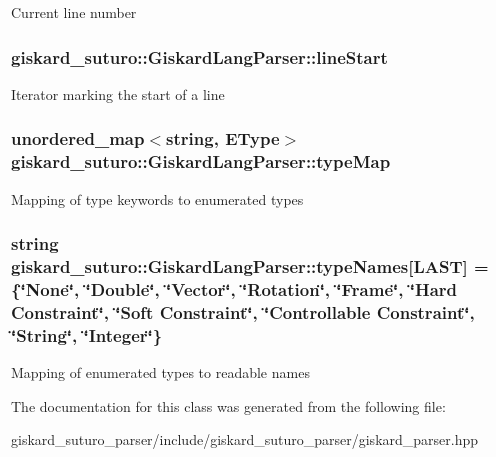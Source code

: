 Current line number \hypertarget{classgiskard__suturo_1_1GiskardLangParser_aee2f868fa5e5ba08ad9f991075930b91}{
\subsubsection[{line\-Start}]{ giskard\-\_\-suturo\-::\-Giskard\-Lang\-Parser\-::line\-Start\hspace{0.3cm}{\ttfamily [private]}}}\label{classgiskard__suturo_1_1GiskardLangParser_aee2f868fa5e5ba08ad9f991075930b91}
Iterator marking the start of a line \hypertarget{classgiskard__suturo_1_1GiskardLangParser_a29f9aebbf699d791e7aa2bb8a2801e55}{
\subsubsection[{type\-Map}]{\setlength{\rightskip}{0pt plus 5cm}unordered\-\_\-map$<$string, {\bf E\-Type}$>$ giskard\-\_\-suturo\-::\-Giskard\-Lang\-Parser\-::type\-Map\hspace{0.3cm}{\ttfamily [private]}}}\label{classgiskard__suturo_1_1GiskardLangParser_a29f9aebbf699d791e7aa2bb8a2801e55}
Mapping of type keywords to enumerated types \hypertarget{classgiskard__suturo_1_1GiskardLangParser_ae67fc056dcafc91683096d0cc4a0f031}{
\subsubsection[{type\-Names}]{\setlength{\rightskip}{0pt plus 5cm}string giskard\-\_\-suturo\-::\-Giskard\-Lang\-Parser\-::type\-Names\mbox{[}L\-A\-S\-T\mbox{]} = \{\char`\"{}None\char`\"{}, \char`\"{}Double\char`\"{}, \char`\"{}Vector\char`\"{}, \char`\"{}Rotation\char`\"{}, \char`\"{}Frame\char`\"{}, \char`\"{}Hard Constraint\char`\"{}, \char`\"{}Soft Constraint\char`\"{}, \char`\"{}Controllable Constraint\char`\"{}, \char`\"{}String\char`\"{}, \char`\"{}Integer\char`\"{}\}\hspace{0.3cm}{\ttfamily [private]}}}\label{classgiskard__suturo_1_1GiskardLangParser_ae67fc056dcafc91683096d0cc4a0f031}
Mapping of enumerated types to readable names 

The documentation for this class was generated from the following file\-:\begin{DoxyCompactItemize}
\item 
giskard\-\_\-suturo\-\_\-parser/include/giskard\-\_\-suturo\-\_\-parser/giskard\-\_\-parser.\-hpp\end{DoxyCompactItemize}
